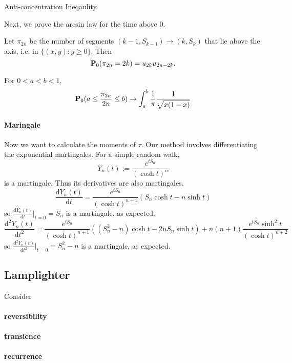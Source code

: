 \begin{remark}
    Anti-concentration Ineqaulity
\end{remark}

Next, we prove the arcsin law for the time above 0.
\begin{lemma}
    Let $\pi_{2n}$ be the number of segments $(k-1,S_{k-1})\to (k,S_k)$ that lie above the axis, i.e. in $\{(x,y):y\geq 0\}$. Then 
    \[ \mathbf{P}_0(\pi_{2n}=2k)=u_{2k}u_{2n-2k}. \]
\end{lemma}
\begin{corollary}
    For $0<a<b<1$,
    \[ \mathbf{P}_0(a\leq \frac{\pi_{2n}}{2n}\leq b)\to \int_{a}^{b}\frac{1}{\pi}\frac{1}{\sqrt{x(1-x)}}\]
\end{corollary}

\paragraph{Maringale} Now we want to calculate the moments of $\tau$. Our method involves differentiating the exponential martingales.
For a simple random walk, 
\[Y_n(t):=\frac{e^{tS_n}}{(\cosh t)^n} \]
is a martingale. Thus its derivatives are also martingales.
\[\frac{\mathrm{d} Y_n(t)}{\mathrm{d} t}=\frac{e^{tS_n}}{(\cosh t)^{n+1}}(S_n\cosh t - n\sinh t)\]
so $\frac{\mathrm{d} Y_n(t)}{\mathrm{d} t}|_{t=0}=S_n$ is a martingale, as expected.
\[\frac{\mathrm{d}^2 Y_n(t)}{\mathrm{d} t^2}=\frac{e^{tS_n}}{(\cosh t)^{n+1}}((S_n^2-n)\cosh t - 2nS_n\sinh t)+n(n+1)\frac{e^{tS_n}\sinh^2t}{(\cosh t)^{n+2}} \]
so $\frac{\mathrm{d}^2 Y_n(t)}{\mathrm{d} t^2}|_{t=0}=S_n^2-n$ is a martingale, as expected.

\subsection{Lamplighter}

\begin{example}
    Consider
\end{example}

\paragraph{reversibility}

\paragraph{transience}

\paragraph{recurrence}


